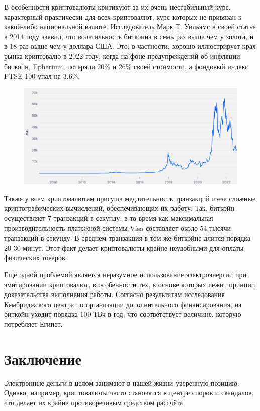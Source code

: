 \documentclass[12pt,a4paper]{article}
\begin{document}
В особенности криптовалюты критикуют за их очень нестабильный курс, характерный практически для всех криптовалют, курс которых не привязан к какой-либо национальной валюте. Исследователь Марк Т. Уильямс в своей статье в 2014 году заявил, что волатильность биткоина в семь раз выше чем у золота, и в 18 раз выше чем у доллара США. Это, в частности, хорошо иллюстрирует крах рынка криптовалю в 2022 году, когда на фоне предупреждений об инфляции биткойн, Epherium, потеряли 20\% и 26\% своей стоимости, а фондовый индекс FTSE 100 упал на 3.6\%.

\begin{figure}[h]
    \centering
    \includegraphics[width=1\textwidth]{pic2}
    \caption{}
    \label{fig:mesh1}
\end{figure}

Также у всем криптовалютам присуща медлительность транзакций из-за сложные криптографических вычислений, обеспечивающих их работу. Так, биткойн осуществляет 7 транзакций в секунду, в то время как максимальная производительность платежной системы Visa составляет около 54 тысячи транзакций в секунду. В среднем транзакция в том же биткойне длится порядка 20-30 минут. Этот факт делает криптовалюты крайне неудобными для оплаты физических товаров. 

Ещё одной проблемой является неразумное использование электроэнергии при эмитировании криптовалют, в особенности тех, в основе которых лежит принцип доказательства выполнения работы. Согласно результатам исследования Кембриджского центра по организации дополнительного финансирования, на биткойн уходит порядка 100 ТВч в год, что соответствует величине, которую потребляет Египет.

\newpage

\section{Заключение}

Электронные деньги в целом занимают в нашей жизни уверенную позицию. Однако, например, криптовалюты часто становятся в центре споров и скандалов, что делает их крайне противоречивым средством рассчёта
\end{document}

